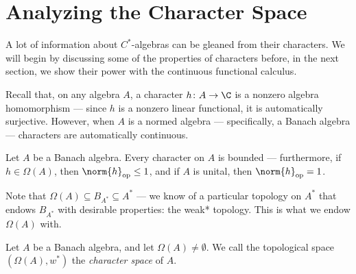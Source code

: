 \section{Analyzing the Character Space}%
A lot of information about $C^{\ast}$-algebras can be gleaned from their characters. We will begin by discussing some of the properties of characters before, in the next section, we show their power with the continuous functional calculus.\newline

Recall that, on any algebra $A$, a character $h\colon A\rightarrow \C$ is a nonzero algebra homomorphism --- since $h$ is a nonzero linear functional, it is automatically surjective. However, when $A$ is a normed algebra --- specifically, a Banach algebra --- characters are automatically continuous.
\begin{proposition}
  Let $A$ be a Banach algebra. Every character on $A$ is bounded --- furthermore, if $h\in \Omega\left( A \right)$, then $\norm{h}_{\op}\leq 1$, and if $A$ is unital, then $\norm{h}_{\op} = 1$.
\end{proposition}
Note that $\Omega\left( A \right)\subseteq B_{A^{\ast}}\subseteq A^{\ast}$ --- we know of a particular topology on $A^{\ast}$ that endows $B_{A^{\ast}}$ with desirable properties: the weak* topology. This is what we endow $\Omega(A)$ with.
\begin{definition}
   Let $A$ be a Banach algebra, and let $\Omega\left( A \right)\neq \emptyset$. We call the topological space $\left( \Omega\left( A \right),w^{\ast} \right)$ the \textit{character space} of $A$.
\end{definition}

